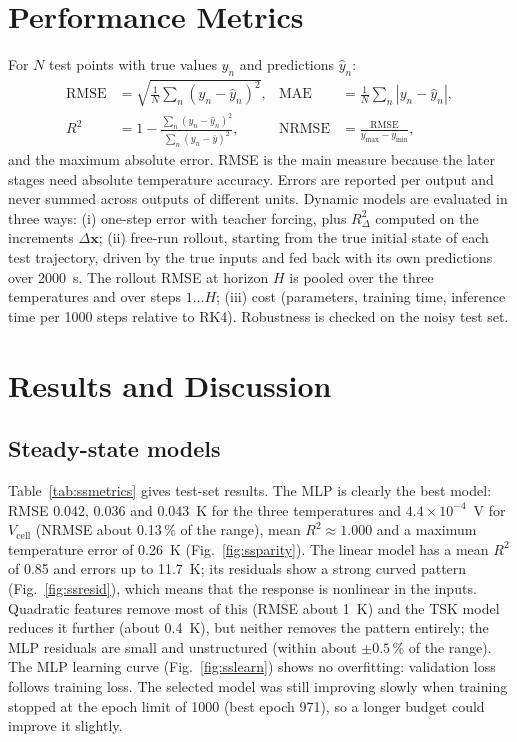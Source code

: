 \documentclass[11pt,a4paper]{article}
\newcommand{\Vcell}{V_{\mathrm{cell}}}
\begin{document}
\section{Performance Metrics}
For $N$ test points with true values $y_n$ and predictions $\hat y_n$:
\begin{align}
\mathrm{RMSE}&=\sqrt{\tfrac1N\textstyle\sum_n(y_n-\hat y_n)^2}, &
\mathrm{MAE}&=\tfrac1N\textstyle\sum_n|y_n-\hat y_n|,\\
R^2&=1-\frac{\sum_n(y_n-\hat y_n)^2}{\sum_n(y_n-\bar y)^2}, &
\mathrm{NRMSE}&=\frac{\mathrm{RMSE}}{y_{\max}-y_{\min}},
\end{align}
and the maximum absolute error. RMSE is the main measure because the later stages need absolute temperature accuracy. Errors are reported per output and never summed across outputs of different units. Dynamic models are evaluated in three ways: (i) one-step error with teacher forcing, plus $R^2_\Delta$ computed on the increments $\Delta\bm x$; (ii) free-run rollout, starting from the true initial state of each test trajectory, driven by the true inputs and fed back with its own predictions over 2000~s. The rollout RMSE at horizon $H$ is pooled over the three temperatures and over steps $1\ldots H$; (iii) cost (parameters, training time, inference time per 1000 steps relative to RK4). Robustness is checked on the noisy test set.

\section{Results and Discussion}
\subsection{Steady-state models}
Table~\ref{tab:ssmetrics} gives test-set results. The MLP is clearly the best model: RMSE $0.042$, $0.036$ and $0.043$~K for the three temperatures and $4.4\times10^{-4}$~V for $\Vcell$ (NRMSE about 0.13\,\% of the range), mean $R^2\approx1.000$ and a maximum temperature error of 0.26~K (Fig.~\ref{fig:ssparity}). The linear model has a mean $R^2$ of 0.85 and errors up to 11.7~K; its residuals show a strong curved pattern (Fig.~\ref{fig:ssresid}), which means that the response is nonlinear in the inputs. Quadratic features remove most of this (RMSE about 1~K) and the TSK model reduces it further (about 0.4~K), but neither removes the pattern entirely; the MLP residuals are small and unstructured (within about $\pm0.5$\,\% of the range). The MLP learning curve (Fig.~\ref{fig:sslearn}) shows no overfitting: validation loss follows training loss. The selected model was still improving slowly when training stopped at the epoch limit of 1000 (best epoch 971), so a longer budget could improve it slightly.
\end{document}
